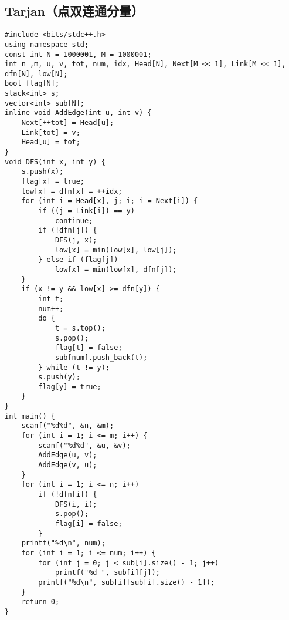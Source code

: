 \documentclass[a4paper]{article}
\begin{document}
\subsection{Tarjan（点双连通分量）}
\begin{lstlisting}
#include <bits/stdc++.h>
using namespace std;
const int N = 1000001, M = 1000001;
int n ,m, u, v, tot, num, idx, Head[N], Next[M << 1], Link[M << 1], dfn[N], low[N];
bool flag[N];
stack<int> s;
vector<int> sub[N];
inline void AddEdge(int u, int v) {
    Next[++tot] = Head[u];
    Link[tot] = v;
    Head[u] = tot;
}
void DFS(int x, int y) {
    s.push(x);
    flag[x] = true;
    low[x] = dfn[x] = ++idx;
    for (int i = Head[x], j; i; i = Next[i]) {
        if ((j = Link[i]) == y)
            continue;
        if (!dfn[j]) {
            DFS(j, x);
            low[x] = min(low[x], low[j]);
        } else if (flag[j])
            low[x] = min(low[x], dfn[j]);
    }
    if (x != y && low[x] >= dfn[y]) {
        int t;
        num++;
        do {
            t = s.top();
            s.pop();
            flag[t] = false;
            sub[num].push_back(t);
        } while (t != y);
        s.push(y);
        flag[y] = true;
    }
}
int main() {
    scanf("%d%d", &n, &m);
    for (int i = 1; i <= m; i++) {
        scanf("%d%d", &u, &v);
        AddEdge(u, v);
        AddEdge(v, u);
    }
    for (int i = 1; i <= n; i++)
        if (!dfn[i]) {
            DFS(i, i);
            s.pop();
            flag[i] = false;
        }
    printf("%d\n", num);
    for (int i = 1; i <= num; i++) {
        for (int j = 0; j < sub[i].size() - 1; j++)
            printf("%d ", sub[i][j]);
        printf("%d\n", sub[i][sub[i].size() - 1]);
    }
    return 0;
}
\end{lstlisting}
\end{document}
